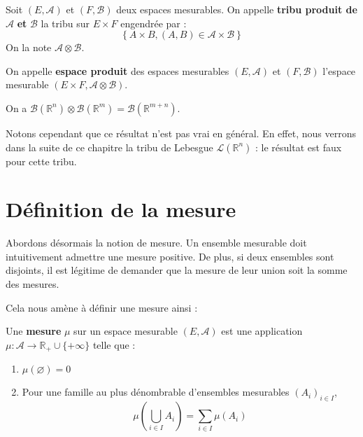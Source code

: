 \documentclass[../integ-proba.tex]{subfiles}
\begin{document}
  \begin{defi}
    Soit $\left(E, \mathcal{A}\right)$ et $\left(F, \mathcal{B}\right)$ deux espaces mesurables.
    On appelle \textbf{tribu produit de} $\mathcal{A}$ \textbf{et} $\mathcal{B}$ la tribu sur $E \times F$ engendrée par :
    \begin{displaymath}
      \left\{A \times B, \left(A, B\right) \in \mathcal{A} \times \mathcal{B}\right\}
    \end{displaymath}
    On la note $\mathcal{A} \otimes \mathcal{B}$.

    On appelle \textbf{espace produit} des espaces mesurables $\left(E, \mathcal{A}\right)$ et $\left(F, \mathcal{B}\right)$ l'espace mesurable $\left(E \times F, \mathcal{A} \otimes \mathcal{B}\right)$.
  \end{defi}

  \begin{exemple}
    On a $\mathcal{B}(\mathbb{R}^n) \otimes \mathcal{B}(\mathbb{R}^m) = \mathcal{B}(\mathbb{R}^{m+n})$.

    Notons cependant que ce résultat n'est pas vrai en général.
    En effet, nous verrons dans la suite de ce chapitre la tribu de Lebesgue $\mathcal{L}(\mathbb{R}^n)$ : le résultat est faux pour cette tribu.
  \end{exemple}

  \section{Définition de la mesure}

  Abordons désormais la notion de mesure.
  Un ensemble mesurable doit intuitivement admettre une mesure positive.
  De plus, si deux ensembles sont disjoints, il est légitime de demander que la mesure de leur union soit la somme des mesures.

  Cela nous amène à définir une mesure ainsi :

  \begin{defi}
    Une \textbf{mesure} $\mu$ sur un espace mesurable $(E, \mathcal{A})$ est une application $\mu : \mathcal{A} \longrightarrow \mathbb{R}_+ \cup \{ +\infty \}$ telle que :
    \begin{enumerate}
      \item $\mu(\varnothing) = 0$
      \item Pour une famille au plus dénombrable d'ensembles mesurables $\left(A_i\right)_{i \in I}$,
      \begin{displaymath}
        \mu\left(\bigcup_{i \in I}A_i\right) = \sum_{i \in I} \mu\left(A_i\right)
      \end{displaymath}
    \end{enumerate}
  \end{defi}
\end{document}
